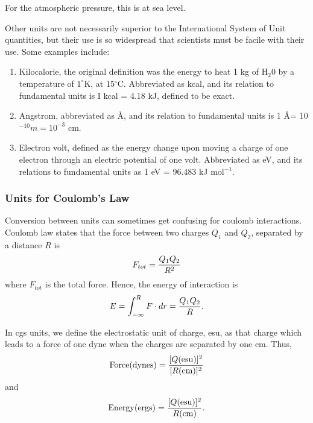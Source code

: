 For the atmospheric pressure, this is at sea level.
    
Other units are not necessarily superior to the International System of Unit 
quantities, but their use is so widespread that scientists must be facile 
with their use. Some examples include:

\begin{enumerate}    
\item Kilocalorie, the original definition was the energy to heat 
1 kg of H$_2$0 by a temperature of $1^{\circ}$K, at 15$^{\circ}$C. Abbreviated 
as kcal, and its relation to fundamental units is I kcal = 4.18 kJ, defined 
to be exact.
    
\item Angstrom, abbreviated as \AA, and its relation to fundamental units is
1 \AA = 10$^{-10}m = 10^{-3}$ cm.
    
\item Electron volt, defined as the energy change upon moving a charge of
one electron through an electric potential of one volt. Abbreviated as
eV, and its relations to fundamental units as 1 eV = 96.483 kJ 
mol$^{-1}$.

\end{enumerate}

\subsubsection{Units for Coulomb's Law}
    
Conversion between units can sometimes get confusing for coulomb 
interactions.  Coulomb law states that the force between two charges 
$Q_1$ and $Q_2$, separated by a distance $R$ is
\begin{equation}
F_{tot} = {Q_1 Q_2 \over R^2}
\end{equation}
where $F_{tot}$ is the total force. Hence, the energy of interaction
is
\begin{equation}
E = \int^{R}_{- \infty} F \cdot d r = {Q_1Q_2 \over R}.
\end{equation}

In cgs units, we define the electrostatic unit of charge, esu, as that 
charge which leads to a force of one dyne when the charges are separated 
by one cm. Thus,
\begin{equation}
\mathrm{Force}(\mathrm{dynes}) = {[Q(\mathrm{esu})]^2 
       \over [R(\mathrm{cm})]^2}
\end{equation}
and
\begin{equation}
\mathrm{Energy}(\mathrm{ergs}) = {[Q(\mathrm{esu})]^2 
        \over R(\mathrm{cm})}.
\end{equation}
    
